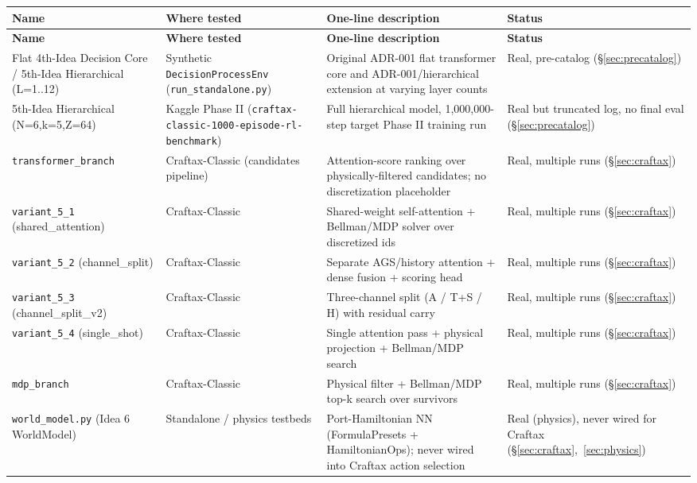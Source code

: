 \documentclass[11pt]{article}
\begin{document}
\begin{longtable}{@{}p{3.4cm}p{3.0cm}p{5.7cm}p{2.6cm}@{}}
\toprule
\textbf{Name} & \textbf{Where tested} & \textbf{One-line description} & \textbf{Status} \\
\midrule
\endfirsthead
\toprule
\textbf{Name} & \textbf{Where tested} & \textbf{One-line description} & \textbf{Status} \\
\midrule
\endhead
Flat 4th-Idea Decision Core / 5th-Idea Hierarchical (L=1..12) & Synthetic \texttt{DecisionProcessEnv} (\texttt{run\_standalone.py}) & Original ADR-001 flat transformer core and ADR-001/hierarchical extension at varying layer counts & Real, pre-catalog (\S\ref{sec:precatalog}) \\
5th-Idea Hierarchical (N=6,k=5,Z=64) & Kaggle Phase II (\texttt{craftax-classic-1000-episode-rl-benchmark}) & Full hierarchical model, 1{,}000{,}000-step target Phase II training run & Real but truncated log, no final eval (\S\ref{sec:precatalog}) \\
\texttt{transformer\_branch} & Craftax-Classic (candidates pipeline) & Attention-score ranking over physically-filtered candidates; no discretization placeholder & Real, multiple runs (\S\ref{sec:craftax}) \\
\texttt{variant\_5\_1} (shared\_attention) & Craftax-Classic & Shared-weight self-attention + Bellman/MDP solver over discretized ids & Real, multiple runs (\S\ref{sec:craftax}) \\
\texttt{variant\_5\_2} (channel\_split) & Craftax-Classic & Separate AGS/history attention + dense fusion + scoring head & Real, multiple runs (\S\ref{sec:craftax}) \\
\texttt{variant\_5\_3} (channel\_split\_v2) & Craftax-Classic & Three-channel split (A / T+S / H) with residual carry & Real, multiple runs (\S\ref{sec:craftax}) \\
\texttt{variant\_5\_4} (single\_shot) & Craftax-Classic & Single attention pass + physical projection + Bellman/MDP search & Real, multiple runs (\S\ref{sec:craftax}) \\
\texttt{mdp\_branch} & Craftax-Classic & Physical filter + Bellman/MDP top-k search over survivors & Real, multiple runs (\S\ref{sec:craftax}) \\
\texttt{world\_model.py} (Idea 6 WorldModel) & Standalone / physics testbeds & Port-Hamiltonian NN (FormulaPresets + HamiltonianOps); never wired into Craftax action selection & Real (physics), never wired for Craftax (\S\ref{sec:craftax},~\ref{sec:physics}) \\

\end{longtable}
\end{document}
